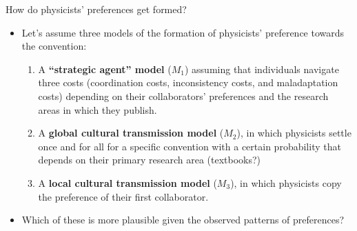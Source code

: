 \documentclass[10pt]{beamer}
\begin{document}
\begin{frame}{How do physicists' preferences get formed?}

\begin{itemize}
    \item Let's assume three models of the formation of physicists' preference towards the convention:
    \begin{enumerate}
        \item A \textbf{``strategic agent'' model} ($M_1$) assuming that individuals navigate three costs (coordination costs, inconsistency costs, and maladaptation costs) depending on their collaborators' preferences and the research areas in which they publish.
        \item A \textbf{global cultural transmission model} ($M_2$), in which physicists settle once and for all for a specific convention with a certain probability that depends on their primary research area (textbooks?)
        \item A \textbf{local cultural transmission model} ($M_3$), in which physicists copy the preference of their first collaborator.
    \end{enumerate}
    \item Which of these is more plausible given the observed patterns of preferences?
\end{itemize}
\end{frame}
\end{document}

